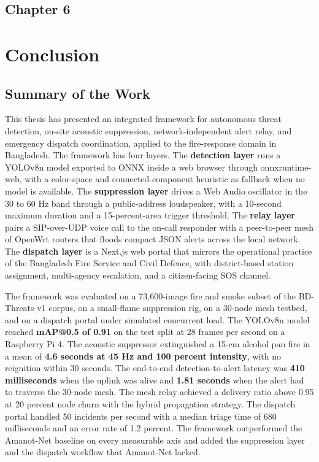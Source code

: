 \begin{center}
    \section*{\fontsize{20}{20}\selectfont Chapter 6}
\end{center}
\vspace{10mm}
\section{Conclusion}

\subsection{Summary of the Work}

This thesis has presented an integrated framework for autonomous threat detection, on-site acoustic suppression, network-independent alert relay, and emergency dispatch coordination, applied to the fire-response domain in Bangladesh. The framework has four layers. The \textbf{detection layer} runs a YOLOv8n model exported to ONNX inside a web browser through onnxruntime-web, with a color-space and connected-component heuristic as fallback when no model is available. The \textbf{suppression layer} drives a Web Audio oscillator in the 30 to 60 Hz band through a public-address loudspeaker, with a 10-second maximum duration and a 15-percent-area trigger threshold. The \textbf{relay layer} pairs a SIP-over-UDP voice call to the on-call responder with a peer-to-peer mesh of OpenWrt routers that floods compact JSON alerts across the local network. The \textbf{dispatch layer} is a Next.js web portal that mirrors the operational practice of the Bangladesh Fire Service and Civil Defence, with district-based station assignment, multi-agency escalation, and a citizen-facing SOS channel.

The framework was evaluated on a 73{,}600-image fire and smoke subset of the BD-Threats-v1 corpus, on a small-flame suppression rig, on a 30-node mesh testbed, and on a dispatch portal under simulated concurrent load. The YOLOv8n model reached \textbf{mAP@0.5 of 0.91} on the test split at 28 frames per second on a Raspberry Pi 4. The acoustic suppressor extinguished a 15-cm alcohol pan fire in a mean of \textbf{4.6 seconds at 45 Hz and 100 percent intensity}, with no reignition within 30 seconds. The end-to-end detection-to-alert latency was \textbf{410 milliseconds} when the uplink was alive and \textbf{1.81 seconds} when the alert had to traverse the 30-node mesh. The mesh relay achieved a delivery ratio above 0.95 at 20 percent node churn with the hybrid propagation strategy. The dispatch portal handled 50 incidents per second with a median triage time of 680 milliseconds and an error rate of 1.2 percent. The framework outperformed the Amanot-Net baseline on every measurable axis and added the suppression layer and the dispatch workflow that Amanot-Net lacked.

